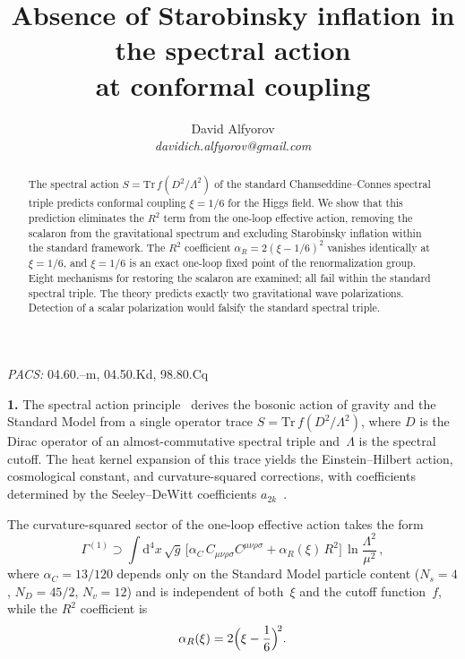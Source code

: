 \documentclass[12pt]{article}
\title{Absence of Starobinsky inflation in the spectral action\\
  at conformal coupling}
\author{David Alfyorov\\[4pt]
\small\textit{davidich.alfyorov@gmail.com}}
\date{}
\newcommand{\dd}{\mathrm{d}}
\begin{document}
\maketitle

\begin{abstract}
The spectral action $S = \mathrm{Tr}\,f(D^2/\Lambda^2)$ of the
standard Chamseddine--Connes spectral triple predicts conformal
coupling $\xi = 1/6$ for the Higgs field.  We show that this
prediction eliminates the $R^2$ term from the one-loop effective
action, removing the scalaron from the gravitational spectrum and
excluding Starobinsky inflation within the standard framework.
The $R^2$ coefficient $\alpha_R = 2(\xi - 1/6)^2$ vanishes
identically at $\xi = 1/6$, and $\xi = 1/6$ is an exact one-loop
fixed point of the renormalization group.  Eight mechanisms for
restoring the scalaron are examined; all fail within the standard
spectral triple.  The theory predicts exactly two gravitational
wave polarizations.  Detection of a scalar polarization would
falsify the standard spectral triple.
\end{abstract}

\noindent\textit{PACS:} 04.60.--m, 04.50.Kd, 98.80.Cq

\medskip

\noindent\textbf{1.}
The spectral action principle~\cite{CC:1996,CC:1997} derives the
bosonic action of gravity and the Standard Model from a single
operator trace $S = \mathrm{Tr}\,f(D^2/\Lambda^2)$, where $D$ is
the Dirac operator of an almost-commutative spectral triple
and~$\Lambda$ is the spectral cutoff.  The heat kernel expansion
of this trace yields the Einstein--Hilbert action, cosmological
constant, and curvature-squared corrections, with coefficients
determined by the Seeley--DeWitt coefficients
$a_{2k}$~\cite{Vassilevich:2003}.

The curvature-squared sector of the one-loop effective action
takes the form~\cite{BV:1987,BV:1990,CZ:2012}
\begin{equation}\label{eq:Gamma}
  \Gamma^{(1)} \supset \int \dd^4x\,\sqrt{g}\,
  \bigl[\alpha_C\, C_{\mu\nu\rho\sigma}C^{\mu\nu\rho\sigma}
  + \alpha_R(\xi)\, R^2\bigr]\,\ln\frac{\Lambda^2}{\mu^2}\,,
\end{equation}
where $\alpha_C = 13/120$ depends only on the Standard Model
particle content ($N_s = 4$, $N_D = 45/2$, $N_v = 12$) and is
independent of both~$\xi$ and the cutoff function~$f$, while the
$R^2$ coefficient is~\cite{Alfyorov:2026paper1}
\begin{equation}\label{eq:alphaR}
  \alpha_R(\xi) = 2\Bigl(\xi - \frac{1}{6}\Bigr)^{\!2}.
\end{equation}
\end{document}
